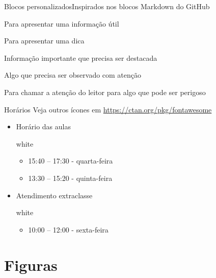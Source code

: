 \documentclass{beamer}
\begin{document}
\begin{frame}[allowframebreaks]{Blocos personalizados}{Inspirados nos blocos Markdown do GitHub}
\begin{nota}
    Para apresentar uma informação útil
\end{nota}

\begin{tip}
    Para apresentar uma dica
\end{tip}

\begin{important}
    Informação importante que precisa ser destacada
\end{important}

\begin{warning}
    Algo que precisa ser observado com atenção
\end{warning}

\begin{caution}
    Para chamar a atenção do leitor para algo que pode ser perigoso
\end{caution}
\end{frame}


\begin{frame}{Horários}
    {Veja outros ícones em \url{https://ctan.org/pkg/fontawesome}}
    \begin{itemize}
        \item Horário das aulas 
        \begin{caixa}[azul]{white}{\faCalendar}
            \begin{itemize}
                \item 15:40 -- 17:30 - quarta-feira
                \item 13:30 -- 15:20 - quinta-feira
            \end{itemize}
        \end{caixa}
        \item Atendimento extraclasse
        \begin{caixa}[azul]{white}{\faCalendar}
            \begin{itemize}
                \item 10:00 -- 12:00 - sexta-feira
            \end{itemize}
        \end{caixa}
    \end{itemize}
\end{frame}


\section{Figuras}
\end{document}
